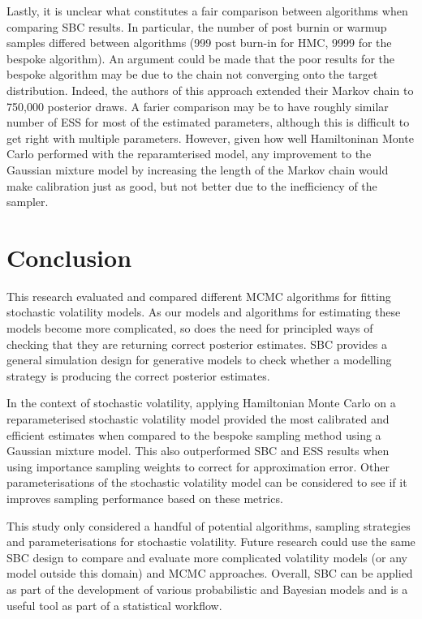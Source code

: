 \documentclass[12pt, a4paper]{article}
\begin{document}
Lastly, it is unclear what constitutes a fair comparison between algorithms when comparing SBC results. In particular, the number of post burnin or warmup samples differed between algorithms (999 post burn-in for HMC, 9999 for the bespoke algorithm). An argument could be made that the poor results for the bespoke algorithm may be due to the chain not converging onto the target distribution. Indeed, the authors of this approach extended their Markov chain to 750,000 posterior draws. A farier comparison may be to have roughly similar number of ESS for most of the estimated parameters, although this is difficult to get right with multiple parameters. However, given how well Hamiltoninan Monte Carlo performed with the reparamterised model, any improvement to the Gaussian mixture model by increasing the length of the Markov chain would make calibration just as good, but not better due to the inefficiency of the sampler. 

\section{Conclusion}
This research evaluated and compared different MCMC algorithms for fitting stochastic volatility models. As our models and algorithms for estimating these models become more complicated, so does the need for principled ways of checking that they are returning correct posterior estimates. SBC provides a general simulation design for generative models to check whether a modelling strategy is producing the correct posterior estimates. 

In the context of stochastic volatility, applying Hamiltonian Monte Carlo on a reparameterised stochastic volatility model provided the most calibrated and efficient estimates when compared to the bespoke sampling method using a Gaussian mixture model. This also outperformed SBC and ESS results when using importance sampling weights to correct for approximation error. Other parameterisations of the stochastic volatility model can be considered to see if it improves sampling performance based on these metrics. 

This study only considered a handful of potential algorithms, sampling strategies and parameterisations for stochastic volatility. Future research could use the same SBC design to compare and evaluate more complicated volatility models (or any model outside this domain) and MCMC approaches. Overall, SBC can be applied as part of the development of various probabilistic and Bayesian models and is a useful tool as part of a statistical workflow.
 
\end{document}
